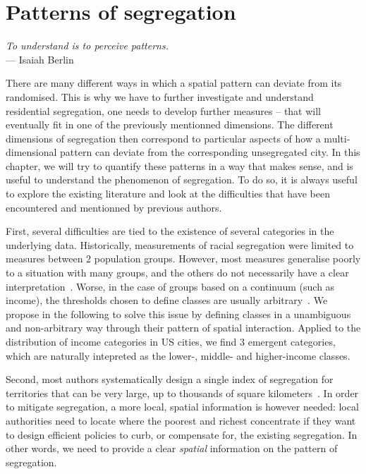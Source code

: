 %
\chapter{Patterns of segregation}
\label{sec:concepts}

\begin{flushright}{\slshape    
To understand is to perceive patterns.} \\ \medskip
--- Isaiah Berlin~\cite{Berlin:2013}
\end{flushright}


\bigskip


There are many different ways in which a spatial pattern can deviate from its
randomised. This is why we have to further investigate and understand
residential segregation, one needs to develop further measures -- that will
eventually fit in one of the previously mentionned dimensions. The different
dimensions of segregation then correspond to particular aspects of how a
multi-dimensional pattern can deviate from the corresponding unsegregated city.
In this chapter, we will try to quantify these patterns in a way that makes
sense, and is useful to understand the phenomenon of segregation. To do so, it
is always useful to explore the existing literature and look at the difficulties
that have been encountered and mentionned by previous authors.

First, several difficulties are tied to the existence of several categories in
the underlying data. Historically, measurements of racial segregation were
limited to measures between $2$ population groups. However, most measures
generalise poorly to a situation with many groups, and the others do not
necessarily have a clear interpretation~\cite{Reardon:2002}. Worse, in the case
of groups based on a continuum (such as income), the thresholds chosen to define
classes are usually arbitrary~\cite{Jargowsky:1996}. We propose in the following
to solve this issue by defining classes in a unambiguous and non-arbitrary way
through their pattern of spatial interaction. Applied to the distribution of
income categories in US cities, we find $3$ emergent categories, which are
naturally intepreted as the lower-, middle- and higher-income classes. 

Second, most authors systematically design a single index of segregation for
territories that can be very large, up to thousands of square
kilometers~\cite{Apparicio:2000}. In order to mitigate segregation, a more
local, spatial information is however needed: local authorities need to locate
where the poorest and richest concentrate if they want to design efficient
policies to curb, or compensate for, the existing segregation. In other words,
we need to provide a clear {\it spatial} information on the pattern of
segregation. 


